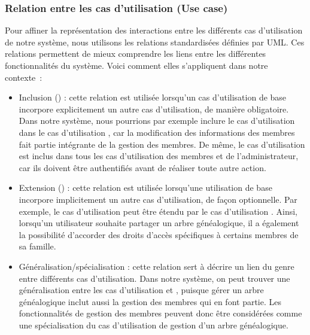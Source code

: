 \subsubsection{Relation entre les cas d'utilisation (Use case)}
Pour affiner la représentation des interactions entre les différents cas
d’utilisation de notre système, nous utilisons les relations standardisées
définies par UML. Ces relations permettent de mieux comprendre les liens entre
les différentes fonctionnalités du système. Voici comment elles s’appliquent
dans notre contexte :

\begin{itemize}
  \item Inclusion () : cette relation est utilisée lorsqu’un cas
    d’utilisation de base incorpore explicitement un autre cas d’utilisation,
    de manière obligatoire. Dans notre système, nous pourrions par exemple
    inclure le cas d’utilisation 
    dans le cas d’utilisation , car la modification des
    informations des membres fait partie intégrante de la gestion des membres.
    De même, le cas d'utilisation  est inclus dans tous
    les cas d'utilisation des membres et de l'administrateur, car ils doivent
    être authentifiés avant de réaliser toute autre action.

  \item Extension () : cette relation est utilisée lorsqu’une
    utilisation de base incorpore implicitement un autre cas d’utilisation, de
    façon optionnelle. Par exemple, le cas d’utilisation 
    peut être étendu par le cas d’utilisation .
    Ainsi, lorsqu’un utilisateur souhaite partager un arbre généalogique, il a
    également la possibilité d’accorder des droits d’accès spécifiques à
    certains membres de sa famille.

  \item Généralisation/spécialisation : cette relation sert à décrire un lien
    du genre  entre différents cas d’utilisation. Dans notre système,
    on peut trouver une généralisation entre les cas d’utilisation  et , puisque gérer un arbre
    généalogique inclut aussi la gestion des membres qui en font partie. Les
    fonctionnalités de gestion des membres peuvent donc être considérées comme
    une spécialisation du cas d’utilisation de gestion d’un arbre généalogique.
\end{itemize}

